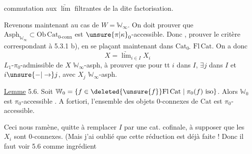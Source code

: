 commutation aux $\underrightarrow{\lim}$ filtrantes de la dite factorisation.

Revenons maintenant au cas de $W=\mathbb W_\infty$. On doit prouver que $\mathrm{Asph}_{\mathbb W_\infty}\subset\mathrm{Ob}\,\mathrm{Cat}_{0\text{-conn}}$ est $\unsure{\pi|\kappa}_0$-accessible. Donc , prouver le critère correspondant à 5.3.1 b), en se plaçant maintenant dans $\mathrm{Cat}_{0\text{-}}$  $\mathrm{Fl}\,\mathrm{Cat}$. On a donc
\[
X=\underrightarrow{\lim}_{i\in I}X_i
\]
 $L_1$-$\pi_0$-admissible de $X$ $\mathbb W_\infty$-asph, à prouver que pour tt $i$ dans $I$, $\exists j$ dans $I$ et $i\unsure{\mathbin{-}|\to}j$, avec $X_j$ $\mathbb W_\infty$-asph.  \inserted{$\big[$J'admets ici les lemmes. \unsure{AQT|AGT}}

\uline{Lemme} 5.6. Soit $\mathbb W_0=\{f\in\deleted{\unsure{f}}\mathrm{Fl}\,\mathrm{Cat}\mid \pi_0(f)\ \text{iso}\}$. Alors $\mathbb W_0$ est  $\pi_0$-accessible . A fortiori, l'ensemble des objets $0$-connexes de $\mathrm{Cat}$ est $\pi_0$-accessible.

Ceci nous ramène, quitte à remplacer $I$ par une cat. cofinale, à supposer que les $X_i$ sont $0$-connexes. (Mais j'ai oublié que cette réduction est déjà faite ! Donc il faut voir 5.6 comme ingrédient
